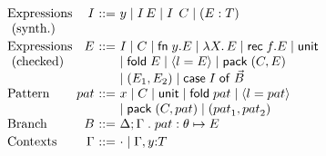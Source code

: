 \documentclass{article}
\begin{document}
\[
\begin{array}{l@{~}r@{~}c@{~}l}
\mbox{Expressions} & I  & \bnfas & y 
  \bnfalt \app I E %
  \bnfalt \app I \ctxi C 
   \bnfalt  (E : T)\\
\mbox{~(synth.)} & & & 
\\[2pt]
\mbox{Expressions} & E & \bnfas &  I 
  \bnfalt C %
  \bnfalt \fn{y}{E}
  \bnfalt \mlam{X}{E} 
  \bnfalt \rec{f}{E} 
  \bnfalt \m{unit}\\
\mbox{~(checked)}& & &   \bnfalt \fold E  \bnfalt \dsum{l=E}   \bnfalt \pack (C , E) \\
&&&  \bnfalt (E_1, E_2) \bnfalt \casebox{I}{\vec{B}} \\
\mbox{Pattern } & {pat} & \bnfas & x \bnfalt C \bnfalt \m{unit} \bnfalt \fold {pat} \bnfalt \dsum{l = {pat}} \\
                         &          &            & \bnfalt \pack (C , {pat}) \bnfalt ({pat}_1, {pat}_2)\\
\mbox{Branch  } & B  & \bnfas &  \casearm{\Delta ; \Gamma\;.\; pat : \theta}{E}
\\[2pt]
\mbox{Contexts} & \Gamma  & \bnfas &  \edot \bnfalt \Gamma, y{:}T \\
\end{array}
\]  
\end{document}
